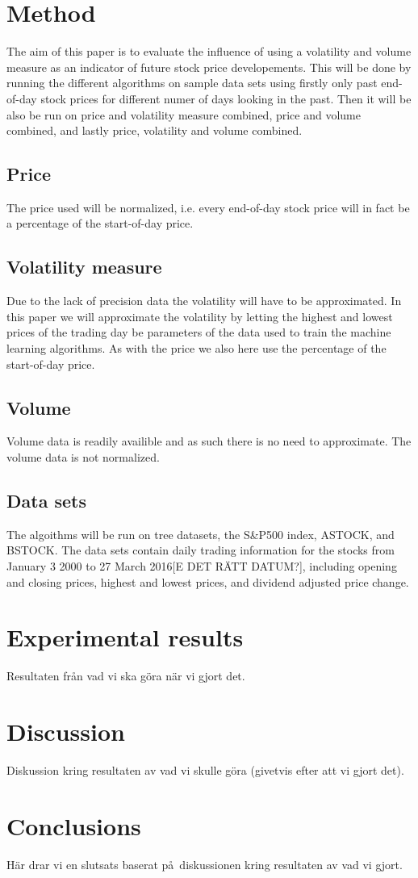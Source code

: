 \documentclass{article}
\begin{document}
\newpage

\section{Method}
The aim of this paper is to evaluate the influence of using a volatility and volume measure as an indicator of future stock price developements. This will be done by running the different algorithms on sample data sets using firstly only past end-of-day stock prices for different numer of days looking in the past. Then it will be also be run on price and volatility measure combined, price and volume combined, and lastly price, volatility and volume combined. 

\subsection{Price}
The price used will be normalized, i.e. every end-of-day stock price will in fact be a percentage of the start-of-day price.

\subsection{Volatility measure}
Due to the lack of precision data the volatility will have to be approximated. In this paper we will approximate the volatility by letting the highest and lowest prices of the trading day be parameters of the data used to train the machine learning algorithms. As with the price we also here use the percentage of the start-of-day price.

\subsection{Volume}
Volume data is readily availible and as such there is no need to approximate. The volume data is not normalized. 

\subsection{Data sets}
The algoithms will be run on tree datasets, the S\&P500 index, ASTOCK, and BSTOCK. The data sets contain daily trading information for the stocks from January 3 2000 to 27 March 2016[E DET R\"ATT DATUM?], including opening and closing prices, highest and lowest prices, and dividend adjusted price change. 

\newpage

\section{Experimental results}
Resultaten fr\aa n vad vi ska g\"ora n\"ar vi gjort det.
\section{Discussion}
Diskussion kring resultaten av vad vi skulle g\"ora (givetvis efter att vi gjort det).
\section{Conclusions}
H\"ar drar vi en slutsats baserat p\aa\ diskussionen kring resultaten av vad vi gjort.
\end{document}

